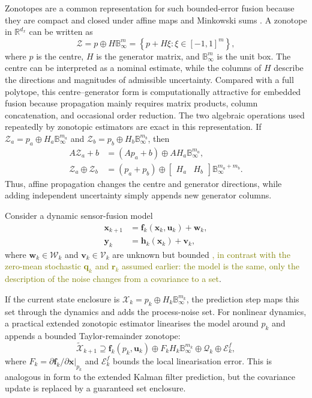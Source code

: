 \documentclass[11pt,oneside,openany]{book}
\newcommand{\added}[1]{\textcolor{RevisionBlue}{#1}}
\begin{document}
Zonotopes are a common representation for such bounded-error fusion because they are compact and closed under affine maps and Minkowski sums \cite{girard2005_zonotopes}. A zonotope in $\mathbb{R}^{d_x}$ can be written as
\begin{equation}
\mathcal{Z}=p\oplus H\mathbb{B}_{\infty}^{m}
=\left\{p+H\xi:\xi\in[-1,1]^m\right\},
\end{equation}
where $p$ is the centre, $H$ is the generator matrix, and $\mathbb{B}_{\infty}^{m}$ is the unit box. The centre can be interpreted as a nominal estimate, while the columns of $H$ describe the directions and magnitudes of admissible uncertainty. Compared with a full polytope, this centre--generator form is computationally attractive for embedded fusion because propagation mainly requires matrix products, column concatenation, and occasional order reduction.
The two algebraic operations used repeatedly by zonotopic estimators are exact in this representation. If $\mathcal{Z}_a=p_a\oplus H_a\mathbb{B}_{\infty}^{m_a}$ and $\mathcal{Z}_b=p_b\oplus H_b\mathbb{B}_{\infty}^{m_b}$, then
\begin{align}
A\mathcal{Z}_a+b
&=(Ap_a+b)\oplus AH_a\mathbb{B}_{\infty}^{m_a},\\
\mathcal{Z}_a\oplus\mathcal{Z}_b
&=(p_a+p_b)\oplus
\begin{bmatrix}H_a&H_b\end{bmatrix}
\mathbb{B}_{\infty}^{m_a+m_b}.
\end{align}
Thus\added{,} affine propagation changes the centre and generator directions, while adding independent uncertainty simply appends new generator columns.

Consider a dynamic sensor-fusion model
\begin{align}
\mathbf{x}_{k+1}&=\mathbf{f}_k(\mathbf{x}_k,\mathbf{u}_k)+\mathbf{w}_k,\\
\mathbf{y}_k&=\mathbf{h}_k(\mathbf{x}_k)+\mathbf{v}_k,
\end{align}
where $\mathbf{w}_k\in\mathcal{W}_k$ and $\mathbf{v}_k\in\mathcal{V}_k$ are unknown but bounded
\textcolor{olive}{, in contrast with the zero-mean stochastic $\mathbf{q}_k$ and $\mathbf{r}_k$ assumed earlier: the model is the same, only the description of the noise changes from a covariance to a set}. 

If the current state enclosure is $\mathcal{X}_k=p_k\oplus H_k\mathbb{B}_{\infty}^{m_k}$, the prediction step maps this set through the dynamics and adds the process-noise set. For nonlinear dynamics, a practical extended zonotopic estimator linearises the model around $p_k$ and appends a bounded Taylor-remainder zonotope:
\begin{equation}
\widetilde{\mathcal{X}}_{k+1}
\supseteq
\mathbf{f}_k(p_k,\mathbf{u}_k)
\oplus F_k H_k\mathbb{B}_{\infty}^{m_k}
\oplus \mathcal{Q}_k
\oplus \mathcal{E}^{f}_k,
\end{equation}
where $F_k=\partial \mathbf{f}_k/\partial \mathbf{x}|_{p_k}$ and $\mathcal{E}^{f}_k$ bounds the local linearisation error. This is analogous in form to the extended Kalman filter prediction, but the covariance update is replaced by a guaranteed set enclosure.
\end{document}
